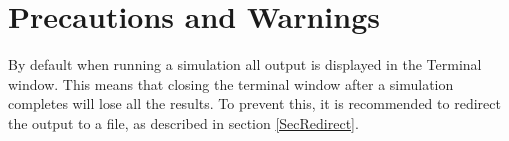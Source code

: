\documentclass[12pt]{article}
\begin{document}
\section{Precautions and Warnings}
By default when running a simulation all output is displayed in the Terminal window. This means that closing the terminal window after a simulation completes will lose all the results. To prevent this, it is recommended to redirect the output to a file, as described in section \ref{SecRedirect}.
\end{document}
